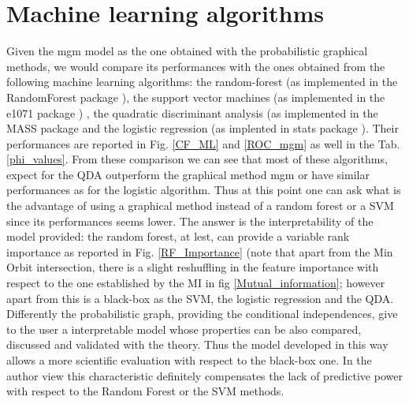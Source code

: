 \documentclass[12pt,%
               a4paper,%
               oneside,openany,%
               titlepage,%
               headinclude,footinclude,%
               BCOR5mm,%
               cleardoublepage=empty,%
               tablecaptionabove,%
               floatperchapter,
               ]{scrreprt}                 %
\begin{document}
\pagebreak

\section{Machine learning algorithms}

Given the mgm model as the one obtained with the probabilistic graphical methods, we would compare its performances with the ones obtained from the following machine learning algorithms: the random-forest (as implemented in the RandomForest package \cite{rfor}), the support vector machines (as implemented in the e1071 package \cite{dimitriadou2008misc}) , the quadratic discriminant analysis (as implemented in the MASS package \cite{MASS} and the logistic regression (as implented in stats package \cite{stats}). Their performances are reported in Fig. \ref{CF_ML} and \ref{ROC_mgm} as well in the Tab. \ref{phi_values}. From these comparison we can see that most of these algorithms, expect for the QDA outperform the graphical method mgm or have similar performances as for the logistic algorithm. Thus at this point one can ask what is the advantage of using a graphical method instead of a random forest or a SVM since its performances seems lower. The answer is the interpretability of the model provided: the random forest, at lest, can provide a variable rank importance as reported in Fig. \ref{RF_Importance} (note that apart from the Min Orbit intersection, there is a slight reshuffling in the feature importance with respect to the one established by the MI in fig \ref{Mutual_information}; however apart from this is a black-box as the SVM, the logistic regression and the QDA. Differently the probabilistic graph, providing the conditional independences, give to the user a interpretable model whose properties can be also compared, discussed and validated with the theory. Thus the model developed in this way allows a more scientific evaluation with respect to the black-box one. In the author view this characteristic definitely compensates the lack of predictive power with respect to the Random Forest or the SVM methods.
\end{document}
